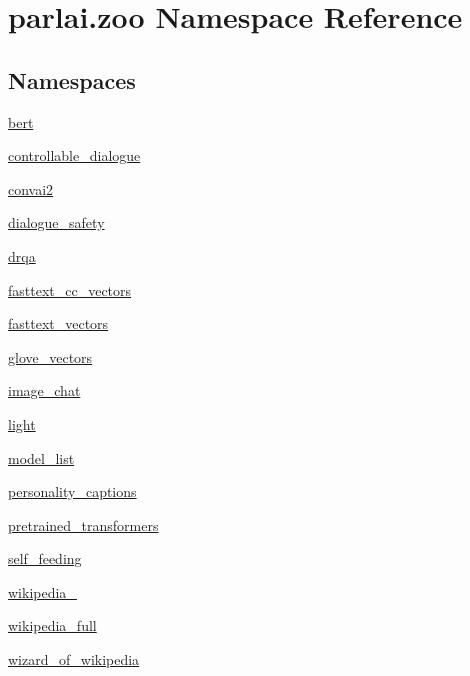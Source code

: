 \hypertarget{namespaceparlai_1_1zoo}{}\section{parlai.\+zoo Namespace Reference}
\label{namespaceparlai_1_1zoo}
\subsection*{Namespaces}
\begin{DoxyCompactItemize}
\item 
 \hyperlink{namespaceparlai_1_1zoo_1_1bert}{bert}
\item 
 \hyperlink{namespaceparlai_1_1zoo_1_1controllable__dialogue}{controllable\+\_\+dialogue}
\item 
 \hyperlink{namespaceparlai_1_1zoo_1_1convai2}{convai2}
\item 
 \hyperlink{namespaceparlai_1_1zoo_1_1dialogue__safety}{dialogue\+\_\+safety}
\item 
 \hyperlink{namespaceparlai_1_1zoo_1_1drqa}{drqa}
\item 
 \hyperlink{namespaceparlai_1_1zoo_1_1fasttext__cc__vectors}{fasttext\+\_\+cc\+\_\+vectors}
\item 
 \hyperlink{namespaceparlai_1_1zoo_1_1fasttext__vectors}{fasttext\+\_\+vectors}
\item 
 \hyperlink{namespaceparlai_1_1zoo_1_1glove__vectors}{glove\+\_\+vectors}
\item 
 \hyperlink{namespaceparlai_1_1zoo_1_1image__chat}{image\+\_\+chat}
\item 
 \hyperlink{namespaceparlai_1_1zoo_1_1light}{light}
\item 
 \hyperlink{namespaceparlai_1_1zoo_1_1model__list}{model\+\_\+list}
\item 
 \hyperlink{namespaceparlai_1_1zoo_1_1personality__captions}{personality\+\_\+captions}
\item 
 \hyperlink{namespaceparlai_1_1zoo_1_1pretrained__transformers}{pretrained\+\_\+transformers}
\item 
 \hyperlink{namespaceparlai_1_1zoo_1_1self__feeding}{self\+\_\+feeding}
\item 
 \hyperlink{namespaceparlai_1_1zoo_1_1wikipedia__20161221}{wikipedia\+\_}
\item 
 \hyperlink{namespaceparlai_1_1zoo_1_1wikipedia__full}{wikipedia\+\_\+full}
\item 
 \hyperlink{namespaceparlai_1_1zoo_1_1wizard__of__wikipedia}{wizard\+\_\+of\+\_\+wikipedia}
\end{DoxyCompactItemize}
